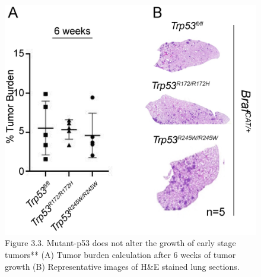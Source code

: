 \begin{figure}
\hypertarget{fig:3.3}{%
\centering
\includegraphics[width=1\textwidth,height=\textheight]{images/p5313.png}
\caption{Figure 3.3. Mutant-p53 does not alter the growth of early stage tumors** (A) Tumor burden calculation after 6 weeks of tumor growth (B) Representative images of H\&E stained lung sections.}\label{fig:3.3}
}
\end{figure}

